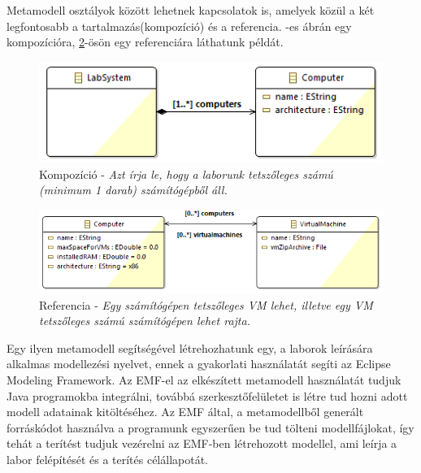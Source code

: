Metamodell osztályok között lehetnek kapcsolatok is, amelyek közül a két legfontosabb a tartalmazás(kompozíció) és a referencia. -es ábrán egy kompozícióra, \ref{fig:emfref}-ösön egy referenciára láthatunk példát.

\begin{figure}[ht!]
	\centering
	\includegraphics[width=115mm, keepaspectratio]{figures/binf_emf_2.png}
	\caption{Kompozíció - \textit{Azt írja le, hogy a laborunk tetszőleges számú (minimum 1 darab) számítógépből áll.}}
	\label{fig:emfcomp}
\end{figure}

\begin{figure}[ht!]
	\centering
	\includegraphics[width=150mm, keepaspectratio]{figures/binf_emf_3.png}
	\caption{Referencia - \textit{Egy számítógépen tetszőleges VM lehet, illetve egy VM tetszőleges számú számítógépen lehet rajta.}}
	\label{fig:emfref}
\end{figure}


Egy ilyen metamodell segítségével létrehozhatunk egy, a laborok leírására alkalmas modellezési nyelvet, ennek a gyakorlati használatát segíti az Eclipse Modeling Framework\cite{steinberg2008emf}. Az EMF-el az elkészített metamodell használatát tudjuk Java programokba integrálni, továbbá szerkesztőfelületet is létre tud hozni adott modell adatainak kitöltéséhez. Az EMF által, a metamodellből generált forráskódot használva a programunk egyszerűen be tud tölteni modellfájlokat, így tehát a terítést tudjuk vezérelni az EMF-ben létrehozott modellel, ami leírja a labor felépítését és a terítés célállapotát.